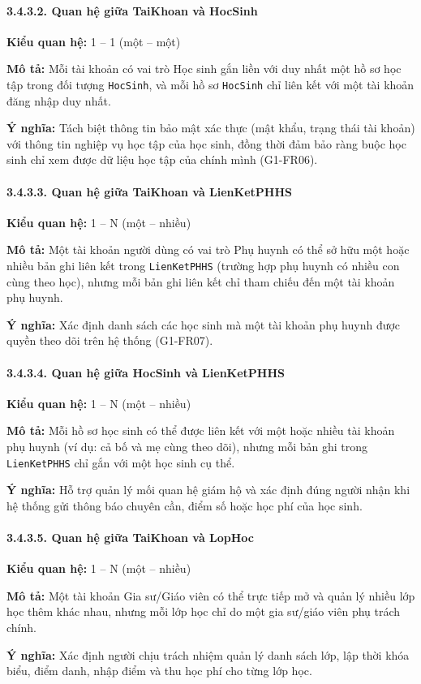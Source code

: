 \documentclass[12pt,a4paper]{article}
\begin{document}
\paragraph{3.4.3.2. Quan hệ giữa TaiKhoan và HocSinh}\mbox{}\par
\textbf{Kiểu quan hệ:} 1 -- 1 (một -- một)\par
\textbf{Mô tả:} Mỗi tài khoản có vai trò Học sinh gắn liền với duy nhất một hồ sơ học tập trong đối tượng \texttt{HocSinh}, và mỗi hồ sơ \texttt{HocSinh} chỉ liên kết với một tài khoản đăng nhập duy nhất.\par
\textbf{Ý nghĩa:} Tách biệt thông tin bảo mật xác thực (mật khẩu, trạng thái tài khoản) với thông tin nghiệp vụ học tập của học sinh, đồng thời đảm bảo ràng buộc học sinh chỉ xem được dữ liệu học tập của chính mình (G1-FR06).

\paragraph{3.4.3.3. Quan hệ giữa TaiKhoan và LienKetPHHS}\mbox{}\par
\textbf{Kiểu quan hệ:} 1 -- N (một -- nhiều)\par
\textbf{Mô tả:} Một tài khoản người dùng có vai trò Phụ huynh có thể sở hữu một hoặc nhiều bản ghi liên kết trong \texttt{LienKetPHHS} (trường hợp phụ huynh có nhiều con cùng theo học), nhưng mỗi bản ghi liên kết chỉ tham chiếu đến một tài khoản phụ huynh.\par
\textbf{Ý nghĩa:} Xác định danh sách các học sinh mà một tài khoản phụ huynh được quyền theo dõi trên hệ thống (G1-FR07).

\paragraph{3.4.3.4. Quan hệ giữa HocSinh và LienKetPHHS}\mbox{}\par
\textbf{Kiểu quan hệ:} 1 -- N (một -- nhiều)\par
\textbf{Mô tả:} Mỗi hồ sơ học sinh có thể được liên kết với một hoặc nhiều tài khoản phụ huynh (ví dụ: cả bố và mẹ cùng theo dõi), nhưng mỗi bản ghi trong \texttt{LienKetPHHS} chỉ gắn với một học sinh cụ thể.\par
\textbf{Ý nghĩa:} Hỗ trợ quản lý mối quan hệ giám hộ và xác định đúng người nhận khi hệ thống gửi thông báo chuyên cần, điểm số hoặc học phí của học sinh.

\paragraph{3.4.3.5. Quan hệ giữa TaiKhoan và LopHoc}\mbox{}\par
\textbf{Kiểu quan hệ:} 1 -- N (một -- nhiều)\par
\textbf{Mô tả:} Một tài khoản Gia sư/Giáo viên có thể trực tiếp mở và quản lý nhiều lớp học thêm khác nhau, nhưng mỗi lớp học chỉ do một gia sư/giáo viên phụ trách chính.\par
\textbf{Ý nghĩa:} Xác định người chịu trách nhiệm quản lý danh sách lớp, lập thời khóa biểu, điểm danh, nhập điểm và thu học phí cho từng lớp học.
\end{document}
